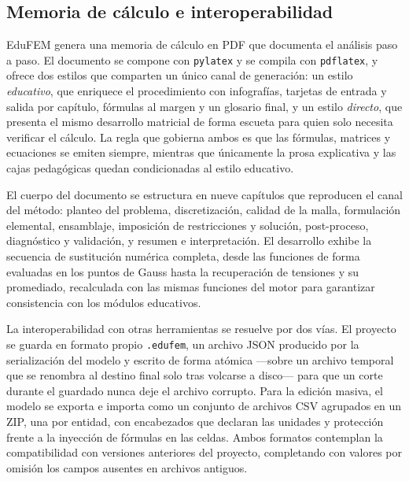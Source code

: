 \subsection{Memoria de cálculo e interoperabilidad}
\label{sec:memoria-io}

EduFEM genera una memoria de cálculo en PDF que documenta el análisis paso a paso. El documento se compone con \texttt{pylatex} y se compila con \texttt{pdflatex}, y ofrece dos estilos que comparten un único canal de generación: un estilo \emph{educativo}, que enriquece el procedimiento con infografías, tarjetas de entrada y salida por capítulo, fórmulas al margen y un glosario final, y un estilo \emph{directo}, que presenta el mismo desarrollo matricial de forma escueta para quien solo necesita verificar el cálculo. La regla que gobierna ambos es que las fórmulas, matrices y ecuaciones se emiten siempre, mientras que únicamente la prosa explicativa y las cajas pedagógicas quedan condicionadas al estilo educativo.

El cuerpo del documento se estructura en nueve capítulos que reproducen el canal del método: planteo del problema, discretización, calidad de la malla, formulación elemental, ensamblaje, imposición de restricciones y solución, post-proceso, diagnóstico y validación, y resumen e interpretación. El desarrollo exhibe la secuencia de sustitución numérica completa, desde las funciones de forma evaluadas en los puntos de Gauss hasta la recuperación de tensiones y su promediado, recalculada con las mismas funciones del motor para garantizar consistencia con los módulos educativos.

La interoperabilidad con otras herramientas se resuelve por dos vías. El proyecto se guarda en formato propio \texttt{.edufem}, un archivo JSON producido por la serialización del modelo y escrito de forma atómica —sobre un archivo temporal que se renombra al destino final solo tras volcarse a disco— para que un corte durante el guardado nunca deje el archivo corrupto. Para la edición masiva, el modelo se exporta e importa como un conjunto de archivos CSV agrupados en un ZIP, una por entidad, con encabezados que declaran las unidades y protección frente a la inyección de fórmulas en las celdas. Ambos formatos contemplan la compatibilidad con versiones anteriores del proyecto, completando con valores por omisión los campos ausentes en archivos antiguos.
